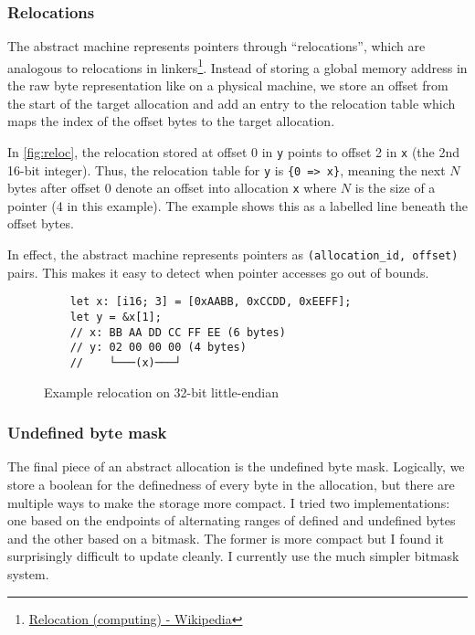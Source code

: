 \documentclass[twocolumn]{article}
\newcommand{\rust}[1]{\texttt{#1}}
\begin{document}
\subsubsection{Relocations}

The abstract machine represents pointers through ``relocations'', which are analogous to relocations
in linkers\footnote{\href{https://en.wikipedia.org/wiki/Relocation_(computing)}{Relocation
(computing) - Wikipedia}}. Instead of storing a global memory address in the raw byte representation
like on a physical machine, we store an offset from the start of the target allocation and add an
entry to the relocation table which maps the index of the offset bytes to the target allocation.

In \autoref{fig:reloc}, the relocation stored at offset 0 in \rust{y} points to offset 2 in \rust{x}
(the 2nd 16-bit integer). Thus, the relocation table for \rust{y} is \texttt{\{0 =>
x\}}, meaning the next $N$ bytes after offset 0 denote an offset into allocation \rust{x} where $N$
is the size of a pointer (4 in this example). The example shows this as a labelled line beneath the
offset bytes.

In effect, the abstract machine represents pointers as \rust{(allocation_id, offset)} pairs. This
makes it easy to detect when pointer accesses go out of bounds.

\begin{figure}[hb]
  \begin{verbatim}
    let x: [i16; 3] = [0xAABB, 0xCCDD, 0xEEFF];
    let y = &x[1];
    // x: BB AA DD CC FF EE (6 bytes)
    // y: 02 00 00 00 (4 bytes)
    //    └───(x)───┘
  \end{verbatim}
  \caption{Example relocation on 32-bit little-endian}
  \label{fig:reloc}
\end{figure}

\subsubsection{Undefined byte mask}

The final piece of an abstract allocation is the undefined byte mask. Logically, we store a boolean
for the definedness of every byte in the allocation, but there are multiple ways to make the storage
more compact. I tried two implementations: one based on the endpoints of alternating ranges of
defined and undefined bytes and the other based on a bitmask. The former is more compact but I found
it surprisingly difficult to update cleanly. I currently use the much simpler bitmask system.
\end{document}

